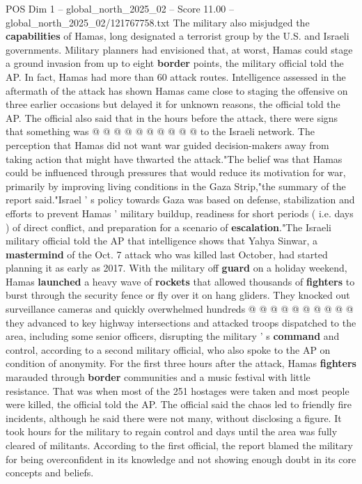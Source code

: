 \begin{textsample}{POS Dim 1 – global\_north\_2025\_02 – Score 11.00 – global\_north\_2025\_02/121767758.txt}
The military also misjudged the \textbf{capabilities} of Hamas, long designated a terrorist group by the U.S. and Israeli governments.
Military planners had envisioned that, at worst, Hamas could stage a ground invasion from up to eight \textbf{border} points, the military official told the AP.
In fact, Hamas had more than 60 attack routes.
Intelligence assessed in the aftermath of the attack has shown Hamas came close to staging the offensive on three earlier occasions but delayed it for unknown reasons, the official told the AP.
The official also said that in the hours before the attack, there were signs that something was @ @ @ @ @ @ @ @ @ @ to the Israeli network.
The perception that Hamas did not want war guided decision-makers away from taking action that might have thwarted the attack."The belief was that Hamas could be influenced through pressures that would reduce its motivation for war, primarily by improving living conditions in the Gaza Strip,"the summary of the report said."Israel ' s policy towards Gaza was based on defense, stabilization and efforts to prevent Hamas ' military buildup, readiness for short periods ( i.e. days ) of direct conflict, and preparation for a scenario of \textbf{escalation}."The Israeli military official told the AP that intelligence shows that Yahya Sinwar, a \textbf{mastermind} of the Oct. 7 attack who was killed last October, had started planning it as early as 2017.
With the military off \textbf{guard} on a holiday weekend, Hamas \textbf{launched} a heavy wave of \textbf{rockets} that allowed thousands of \textbf{fighters} to burst through the security fence or fly over it on hang gliders.
They knocked out surveillance cameras and quickly overwhelmed hundreds @ @ @ @ @ @ @ @ @ @ they advanced to key highway intersections and attacked troops dispatched to the area, including some senior officers, disrupting the military ' s \textbf{command} and control, according to a second military official, who also spoke to the AP on condition of anonymity.
For the first three hours after the attack, Hamas \textbf{fighters} marauded through \textbf{border} communities and a music festival with little resistance.
That was when most of the 251 hostages were taken and most people were killed, the official told the AP.
The official said the chaos led to friendly fire incidents, although he said there were not many, without disclosing a figure.
It took hours for the military to regain control and days until the area was fully cleared of militants.
According to the first official, the report blamed the military for being overconfident in its knowledge and not showing enough doubt in its core concepts and beliefs.

\end{textsample}
